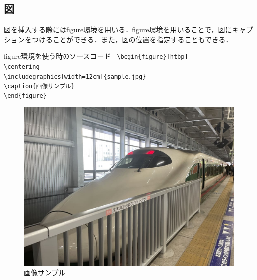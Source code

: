 \subsection{図}
図を挿入する際にはfigure環境を用いる．figure環境を用いることで，図にキャプションをつけることができる．また，図の位置を指定することもできる．
\begin{itembox}[c]{figure環境を使う時のソースコード}
  \texttt{
  \hspace{-0.5\zw}\textbackslash begin\{figure\}[htbp]\\
  \hspace{4\zw}\textbackslash centering\\
  \hspace{4\zw}\textbackslash includegraphics[width=12cm]\{sample.jpg\}\\
  \hspace{4\zw}\textbackslash caption\{画像サンプル\}\\
  \textbackslash end\{figure\}
  }
\end{itembox}
\begin{figure}[htbp]
  \centering
  \includegraphics[width=12cm]{src/sample.jpg}
  \caption{画像サンプル}
\end{figure}
